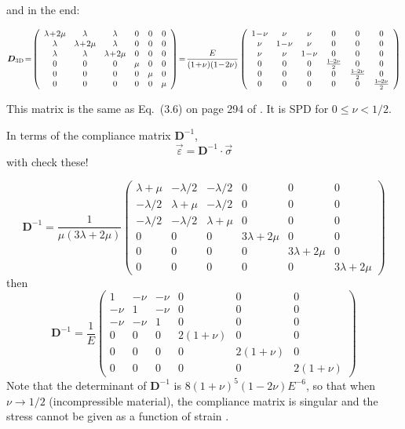 and in the end:
\begin{mdframed}[backgroundcolor=blue!5]
\begin{equation}
{\bm D}_{\rm 3D} \!= \!
\left(
\begin{array}{cccccc}
\lambda\!+\!2\mu & \lambda & \lambda & 0 & 0 & 0 \\ 
\lambda & \lambda\!+\!2\mu & \lambda & 0 & 0 & 0 \\ 
\lambda & \lambda & \lambda\!+\!2\mu & 0 & 0 & 0 \\
0 & 0 & 0 & \mu & 0 & 0 \\ 
0 & 0 & 0 & 0 & \mu & 0 \\ 
0 & 0 & 0 & 0 & 0 & \mu  
\end{array}
\right)
\!=\!
\frac{E}{(1\!+\!\nu)(1\!-\!2\nu)}
\left(
\begin{array}{cccccc}
1\!-\!\nu & \nu & \nu & 0 & 0 & 0 \\ 
\nu & 1\!-\!\nu & \nu& 0 & 0 & 0 \\ 
\nu & \nu & 1\!-\!\nu & 0 & 0 & 0 \\
0 & 0 & 0 & \frac{1\!-\!2\nu}{2} & 0 & 0 \\ 
0 & 0 & 0 & 0 & \frac{1\!-\!2\nu}{2} & 0 \\ 
0 & 0 & 0 & 0 & 0 & \frac{1\!-\!2\nu}{2}
\end{array}
\right)
\label{eq:D_3D}
\end{equation}
\end{mdframed}
This matrix is the same as Eq.~(3.6) on page 294 of \textcite{braess}.
It is SPD for $0\leq \nu < 1/2$.

In terms of the compliance matrix ${\bm D}^{-1}$,
\[
\vec{\varepsilon} 
= {\bm D}^{-1} \cdot \vec{\sigma}
\]
with
{\color{red} check these!}

\[
{\bm D}^{-1}
=
\frac{1}{\mu(3\lambda+2\mu)}
\left(
\begin{array}{cccccc}
\lambda+\mu & -\lambda/2 & -\lambda/2 & 0 & 0 & 0 \\
-\lambda/2 & \lambda+\mu & -\lambda/2 & 0 & 0 & 0 \\
-\lambda/2 & -\lambda/2 & \lambda+\mu & 0 & 0 & 0 \\
0 & 0 & 0 & 3\lambda+2\mu & 0 & 0 \\ 
0 & 0 & 0 & 0 & 3\lambda+2\mu & 0 \\ 
0 & 0 & 0 & 0 & 0 & 3\lambda+2\mu  
\end{array}
\right)
\]
then
\[
{\bm D}^{-1}
=
\frac{1}{E}
\left(
\begin{array}{cccccc}
1 & -\nu & -\nu & 0 & 0 & 0 \\
-\nu & 1 & -\nu & 0 & 0 & 0 \\
-\nu & -\nu & 1 & 0 & 0 & 0 \\
0 & 0 & 0 & 2(1+\nu) & 0 & 0 \\ 
0 & 0 & 0 & 0 & 2(1+\nu) & 0 \\ 
0 & 0 & 0 & 0 & 0 & 2(1+\nu) 
\end{array}
\right)
\]
Note that the determinant  of ${\bm D}^{-1}$ is $8(1+\nu)^5(1-2\nu)E^{-6}$, so that when $\nu\rightarrow 1/2$ (incompressible material), the compliance matrix is singular and the stress cannot be given as a function of strain \cite{lubliner}.

